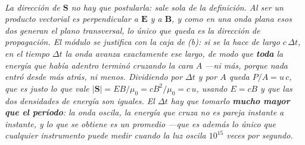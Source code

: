 \begin{center}
\begin{tikzpicture}[scale=0.92, transform shape]
\end{tikzpicture}\\[0.5em]
{\small\itshape La dirección de $\mathbf{S}$ no hay que postularla: sale sola de
la definición. Al ser un producto vectorial es perpendicular a $\mathbf{E}$ y a
$\mathbf{B}$, y como en una onda plana esos dos generan el plano transversal, lo
único que queda es la dirección de propagación. El módulo se justifica con la
caja de (b): si se la hace de largo $c\,\Delta t$, en el tiempo $\Delta t$ la
onda avanza exactamente ese largo, de modo que \textbf{toda} la energía que
había adentro terminó cruzando la cara $A$ ---ni más, porque nada entró desde
más atrás, ni menos. Dividiendo por $\Delta t$ y por $A$ queda $P/A = u\,c$, que
es justo lo que vale $|\mathbf{S}| = EB/\mu_0 = cB^2/\mu_0 = c\,u$, usando
$E = cB$ y que las dos densidades de energía son iguales. El $\Delta t$ hay que
tomarlo \textbf{mucho mayor que el período}: la onda oscila, la energía que
cruza no es pareja instante a instante, y lo que se obtiene es un promedio ---que
es además lo único que cualquier instrumento puede medir cuando la luz oscila
$10^{15}$ veces por segundo.}
\end{center}
